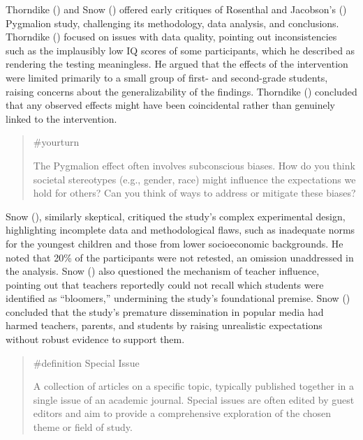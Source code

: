 \documentclass[
  letterpaper,
]{book}
\begin{document}
Thorndike () and Snow
() offered early critiques of Rosenthal
and Jacobson's () Pygmalion
study, challenging its methodology, data analysis, and conclusions.
Thorndike () focused on issues with
data quality, pointing out inconsistencies such as the implausibly low
IQ scores of some participants, which he described as rendering the
testing meaningless. He argued that the effects of the intervention were
limited primarily to a small group of first- and second-grade students,
raising concerns about the generalizability of the findings. Thorndike
() concluded that any observed
effects might have been coincidental rather than genuinely linked to the
intervention.

\begin{quote}
{\#yourturn}

The Pygmalion effect often involves subconscious biases. How do you
think societal stereotypes (e.g., gender, race) might influence the
expectations we hold for others? Can you think of ways to address or
mitigate these biases?
\end{quote}

Snow (), similarly skeptical, critiqued
the study's complex experimental design, highlighting incomplete data
and methodological flaws, such as inadequate norms for the youngest
children and those from lower socioeconomic backgrounds. He noted that
20\% of the participants were not retested, an omission unaddressed in
the analysis. Snow () also questioned the
mechanism of teacher influence, pointing out that teachers reportedly
could not recall which students were identified as ``bloomers,''
undermining the study's foundational premise. Snow
() concluded that the study's premature
dissemination in popular media had harmed teachers, parents, and
students by raising unrealistic expectations without robust evidence to
support them.

\begin{quote}
\label{def-specialissue}{\#definition} Special Issue

A collection of articles on a specific topic, typically published
together in a single issue of an academic journal. Special issues are
often edited by guest editors and aim to provide a comprehensive
exploration of the chosen theme or field of study.
\end{quote}
\end{document}
